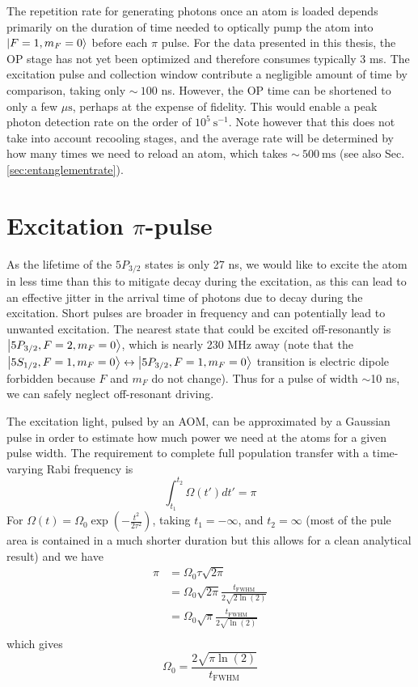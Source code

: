 The repetition rate for generating photons once an atom is loaded depends primarily on the duration of time needed to optically pump the atom into $\ket{F=1,m_F=0}$ before each $\pi$ pulse. For the data presented in this thesis, the OP stage has not yet been optimized and therefore consumes typically 3 ms. The excitation pulse and collection window contribute a negligible amount of time by comparison, taking only $\sim~100$ ns. However, the OP time can be shortened to only a few $\mu \mathrm{s}$, perhaps at the expense of fidelity\cite{zhou2024long}. This would enable a peak photon detection rate on the order of $10^{5}~\mathrm{s}^{-1}$. Note however that this does not take into account recooling stages, and the average rate will be determined by how many times we need to reload an atom, which takes $\sim~500~\mathrm{ms}$ (see also Sec. \ref{sec:entanglementrate}).

\section{Excitation $\pi$-pulse}
As the lifetime of the $5P_{3/2}$ states is only 27 ns, we would like to excite the atom in less time than this to mitigate decay during the excitation, as this can lead to an effective jitter in the arrival time of photons due to decay during the excitation. Short pulses are broader in frequency and can potentially lead to unwanted excitation. The nearest state that could be excited off-resonantly is $\ket{5P_{3/2},F=2,m_F=0}$, which is nearly 230 MHz away (note that the $\ket{5S_{1/2},F=1,m_F=0} \leftrightarrow \ket{5P_{3/2},F=1,m_F=0}$ transition is electric dipole forbidden because $F$ and $m_F$ do not change). Thus for a pulse of width $\sim$10 ns, we can safely neglect off-resonant driving.

The excitation light, pulsed by an AOM, can be approximated by a Gaussian pulse in order to estimate how much power we need at the atoms for a given pulse width. The requirement to complete full population transfer with a time-varying Rabi frequency is 
\begin{equation}
\int_{t_1}^{t_2} \Omega(t') dt' =\pi
\end{equation}
For $\Omega(t)=\Omega_0 \exp({-\frac{t^2}{2\tau^2}})$, taking $t_1=-\infty$, and $t_2=\infty$ (most of the pule area is contained in a much shorter duration but this allows for a clean analytical result) and we have
\begin{equation} \label{eq:pi}
\begin{split}
\pi & = \Omega_0 \tau \sqrt{2 \pi} \\
 & = \Omega_0 \sqrt{2 \pi} \frac{t_{\textrm{FWHM}}}{2\sqrt{2\ln(2)}} \\
 & = \Omega_0 \sqrt{\pi} \frac{t_{\textrm{FWHM}}}{2\sqrt{\ln(2)}} \\
\end{split}
\end{equation}
which gives
\begin{equation}
    \Omega_0=\frac{2\sqrt{\pi \ln(2)}}{t_{\textrm{FWHM}}}
\end{equation}

